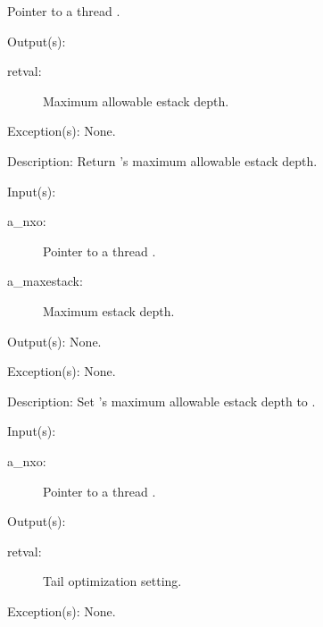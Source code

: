 \begin{capi}
\begin{capilist}
\begin{description}
			Pointer to a thread .
		\end{description}
	\item[Output(s): ]
		\begin{description}\item[]
		\item[retval: ]
			Maximum allowable estack depth.
		\end{description}
	\item[Exception(s): ] None.
	\item[Description: ]
		Return 's maximum allowable estack depth.
	\end{capilist}
\label{nxo_thread_maxestack_set}
	\begin{capilist}
	\item[Input(s): ]
		\begin{description}\item[]
		\item[a\_nxo: ]
			Pointer to a thread .
		\item[a\_maxestack: ]
			Maximum estack depth.
		\end{description}
	\item[Output(s): ] None.
	\item[Exception(s): ] None.
	\item[Description: ]
		Set 's maximum allowable estack depth to
		.
	\end{capilist}
\label{nxo_thread_tailopt_get}
	\begin{capilist}
	\item[Input(s): ]
		\begin{description}\item[]
		\item[a\_nxo: ]
			Pointer to a thread \classname{nxo}.
		\end{description}
	\item[Output(s): ]
		\begin{description}\item[]
		\item[retval: ]
			Tail optimization setting.
		\end{description}
	\item[Exception(s): ] None.

\end{capilist}
\end{capi}
